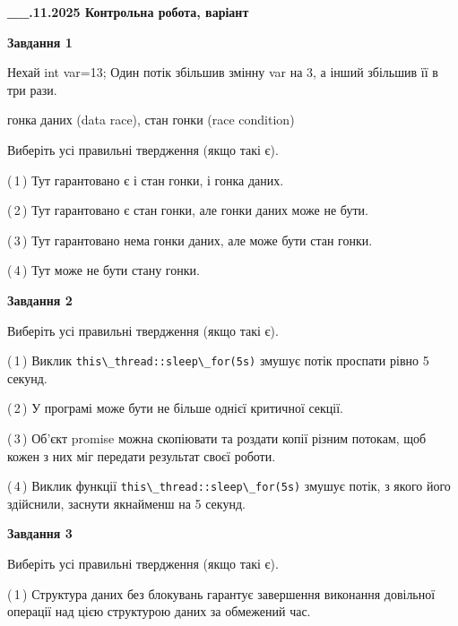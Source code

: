 \documentclass[12pt, ukrainian]{article}
\def\code#1{\Verb!#1!}
\begin{document}
\begin {large}

\textbf{\_\_.11.2025 Контрольна робота, варіант  }\par


{

\begin{center}
\textbf{Завдання 1}
\end{center}
Нехай int var=13; Один потік збільшив змінну var на 3, а інший збільшив її в три рази.

гонка даних (data race), стан гонки (race condition)

Виберіть усі правильні твердження (якщо такі є).\par
\vspace{2mm}
(\,1\,) Тут гарантовано є і стан гонки, і гонка даних.%

(\,2\,) Тут гарантовано є стан гонки, але гонки даних може не бути.%

(\,3\,) Тут гарантовано нема гонки даних, але може бути стан гонки.%

(\,4\,) Тут може не бути стану гонки.%



\begin{center}
\textbf{Завдання 2}
\end{center}
Виберіть усі правильні твердження (якщо такі є).\par
\vspace{2mm}

(\,1\,) Виклик \code{this\_thread::sleep\_for(5s)} змушує потік проспати рівно 5 секунд.%

(\,2\,) У програмі може бути не більше однієї критичної секції.%

(\,3\,) Об’єкт promise можна скопіювати та роздати копії різним потокам, щоб кожен з них міг передати результат своєї роботи.%

(\,4\,) Виклик функції \code{this\_thread::sleep\_for(5s)} змушує потік, з якого його здійснили, заснути якнайменш на 5 секунд.%



\begin{center}
\textbf{Завдання 3}
\end{center}
Виберіть усі правильні твердження (якщо такі є).\par
\vspace{2mm}

(\,1\,) Структура даних без блокувань гарантує завершення виконання довільної операції над цією структурою даних за обмежений час.%

}
\end{large}
\end{document}
